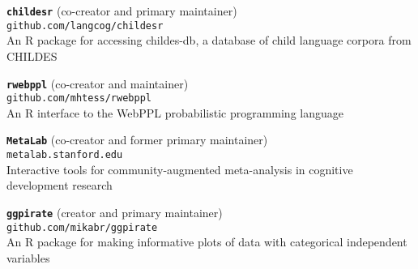 \documentclass[11pt,]{article}
\begin{document}
\textbf{\texttt{childesr}} (co-creator and primary maintainer)\\
\hspace*{0.333em}\hspace*{0.333em}\hspace*{0.333em}\hspace*{0.333em}\texttt{github.com/langcog/childesr}\\
\hspace*{0.333em}\hspace*{0.333em}\hspace*{0.333em}\hspace*{0.333em}An R
package for accessing childes-db, a database of child language corpora
from CHILDES

\textbf{\texttt{rwebppl}} (co-creator and maintainer)\\
\hspace*{0.333em}\hspace*{0.333em}\hspace*{0.333em}\hspace*{0.333em}\texttt{github.com/mhtess/rwebppl}\\
\hspace*{0.333em}\hspace*{0.333em}\hspace*{0.333em}\hspace*{0.333em}An R
interface to the WebPPL probabilistic programming language

\textbf{\texttt{MetaLab}} (co-creator and former primary maintainer)\\
\hspace*{0.333em}\hspace*{0.333em}\hspace*{0.333em}\hspace*{0.333em}\texttt{metalab.stanford.edu}\\
\hspace*{0.333em}\hspace*{0.333em}\hspace*{0.333em}\hspace*{0.333em}Interactive
tools for community-augmented meta-analysis in cognitive development
research

\textbf{\texttt{ggpirate}} (creator and primary maintainer)\\
\hspace*{0.333em}\hspace*{0.333em}\hspace*{0.333em}\hspace*{0.333em}\texttt{github.com/mikabr/ggpirate}\\
\hspace*{0.333em}\hspace*{0.333em}\hspace*{0.333em}\hspace*{0.333em}An R
package for making informative plots of data with categorical
independent variables
\end{document}
